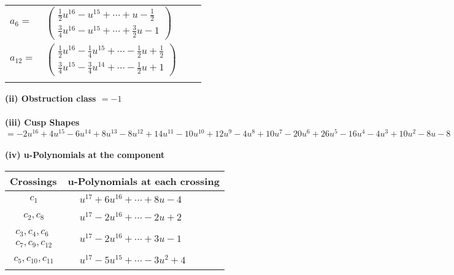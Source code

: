 \documentclass[1p]{elsarticle_modified}
\theoremstyle{definition}
\begin{document}
\begin{tabular}{m{7pt} m{180pt} m{7pt} m{180pt} }
\flushright $a_{6}=$&$\begin{pmatrix}\frac{1}{2} u^{16}- u^{15}+\cdots+u-\frac{1}{2}\\\frac{3}{4} u^{16}- u^{15}+\cdots+\frac{3}{2} u-1\end{pmatrix}$ \\
\flushright $a_{12}=$&$\begin{pmatrix}\frac{1}{2} u^{16}-\frac{1}{4} u^{15}+\cdots-\frac{1}{2} u+\frac{1}{2}\\\frac{3}{4} u^{15}-\frac{3}{4} u^{14}+\cdots-\frac{1}{2} u+1\end{pmatrix}$\\&\end{tabular}
\flushleft \textbf{(ii) Obstruction class $= -1$}\\~\\
\flushleft \textbf{(iii) Cusp Shapes $= -2 u^{16}+4 u^{15}-6 u^{14}+8 u^{13}-8 u^{12}+14 u^{11}-10 u^{10}+12 u^9-4 u^8+10 u^7-20 u^6+26 u^5-16 u^4-4 u^3+10 u^2-8 u-8$}\\~\\
\newpage\renewcommand{\arraystretch}{1}
\flushleft \textbf{(iv) u-Polynomials at the component}\newline \\
\begin{tabular}{m{50pt}|m{274pt}}
Crossings & \hspace{64pt}u-Polynomials at each crossing \\
\hline $$\begin{aligned}c_{1}\end{aligned}$$&$\begin{aligned}
&u^{17}+6 u^{16}+\cdots+8 u-4
\end{aligned}$\\
\hline $$\begin{aligned}c_{2},c_{8}\end{aligned}$$&$\begin{aligned}
&u^{17}-2 u^{16}+\cdots-2 u+2
\end{aligned}$\\
\hline $$\begin{aligned}c_{3},c_{4},c_{6}\\c_{7},c_{9},c_{12}\end{aligned}$$&$\begin{aligned}
&u^{17}-2 u^{16}+\cdots+3 u-1
\end{aligned}$\\
\hline $$\begin{aligned}c_{5},c_{10},c_{11}\end{aligned}$$&$\begin{aligned}
&u^{17}-5 u^{15}+\cdots-3 u^2+4
\end{aligned}$\\
\hline
\end{tabular}\\~\\
\end{document}
